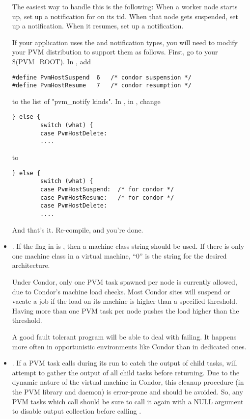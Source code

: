 \begin{itemize}
  The easiest way to handle this is the following:  When a worker
  node starts up, set up a notification for  on
  its tid.  When that node gets suspended, set up a 
  notification.  When it resumes, set up a 
  notification.

  If your application uses the  and
   notification types, you will need to modify
  your PVM distribution to support them as follows.  First, go to your
  \$(PVM\_ROOT). In , add
\begin{verbatim}
#define PvmHostSuspend  6   /* condor suspension */
#define PvmHostResume   7   /* condor resumption */
\end{verbatim}

  to the list of "pvm\_notify kinds".
  In , in , change 

\begin{verbatim}
} else {
        switch (what) {
        case PvmHostDelete:
        ....
\end{verbatim}
to 
\begin{verbatim}
} else {
        switch (what) {
        case PvmHostSuspend:  /* for condor */
        case PvmHostResume:   /* for condor */
        case PvmHostDelete:
        ....
\end{verbatim}
And that's it. Re-compile, and you're done. 


\item {}.  If the flag in  is 
  , then a machine class string 
  should be used.  If there is only one machine class
  in a virtual machine, ``0'' is the string for the desired architecture.

  Under Condor, only one
  PVM task spawned per node is currently allowed,
  due to Condor's machine load checks.
  Most Condor 
  sites will suspend or vacate
  a job if the load on its machine is higher than a specified
  threshold.
  Having more than one PVM task per node pushes the load
  higher than the threshold.

  A good fault tolerant program will be able to deal with
   failing.  It happens more often in opportunistic 
  environments like Condor than in dedicated ones.

\item {}.  If a PVM task calls 
  during its run to catch the output of child tasks,
   will attempt to gather the output of all child
  tasks before returning.  Due to the dynamic nature of the virtual
  machine in Condor, this cleanup procedure (in the PVM library and
  daemon) is error-prone and should be avoided.  So, any PVM tasks
  which call  should be sure to call it again
  with a NULL argument to disable output collection before calling
  .

\end{itemize}

